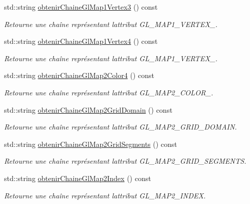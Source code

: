 \begin{DoxyCompactItemize}
std\+::string \hyperlink{group__utilitaire_gafe0e07682a0bb42bb227fecd287de609}{obtenir\+Chaine\+Gl\+Map1\+Vertex3} () const 
\begin{DoxyCompactList}\small\item\em Retourne une chaîne représentant l\textquotesingle{}attribut G\+L\+\_\+\+M\+A\+P1\+\_\+\+V\+E\+R\+T\+E\+X\+\_. \end{DoxyCompactList}\item 
std\+::string \hyperlink{group__utilitaire_gab130a35770d4594bf74a89d18c49697a}{obtenir\+Chaine\+Gl\+Map1\+Vertex4} () const 
\begin{DoxyCompactList}\small\item\em Retourne une chaîne représentant l\textquotesingle{}attribut G\+L\+\_\+\+M\+A\+P1\+\_\+\+V\+E\+R\+T\+E\+X\+\_. \end{DoxyCompactList}\item 
std\+::string \hyperlink{group__utilitaire_ga85dca50f7d25944ca4158173a630d15d}{obtenir\+Chaine\+Gl\+Map2\+Color4} () const 
\begin{DoxyCompactList}\small\item\em Retourne une chaîne représentant l\textquotesingle{}attribut G\+L\+\_\+\+M\+A\+P2\+\_\+\+C\+O\+L\+O\+R\+\_. \end{DoxyCompactList}\item 
std\+::string \hyperlink{group__utilitaire_ga15f308a3995cd63e0bf8ff13fd1024dd}{obtenir\+Chaine\+Gl\+Map2\+Grid\+Domain} () const 
\begin{DoxyCompactList}\small\item\em Retourne une chaîne représentant l\textquotesingle{}attribut G\+L\+\_\+\+M\+A\+P2\+\_\+\+G\+R\+I\+D\+\_\+\+D\+O\+M\+A\+I\+N. \end{DoxyCompactList}\item 
std\+::string \hyperlink{group__utilitaire_ga7cc72b6b6d1f670c6bb2a37bb02f22cc}{obtenir\+Chaine\+Gl\+Map2\+Grid\+Segments} () const 
\begin{DoxyCompactList}\small\item\em Retourne une chaîne représentant l\textquotesingle{}attribut G\+L\+\_\+\+M\+A\+P2\+\_\+\+G\+R\+I\+D\+\_\+\+S\+E\+G\+M\+E\+N\+T\+S. \end{DoxyCompactList}\item 
std\+::string \hyperlink{group__utilitaire_ga5c26c0fce87b7c852f2819ddbc816835}{obtenir\+Chaine\+Gl\+Map2\+Index} () const 
\begin{DoxyCompactList}\small\item\em Retourne une chaîne représentant l\textquotesingle{}attribut G\+L\+\_\+\+M\+A\+P2\+\_\+\+I\+N\+D\+E\+X. \end{DoxyCompactList}\item 

\end{DoxyCompactItemize}
